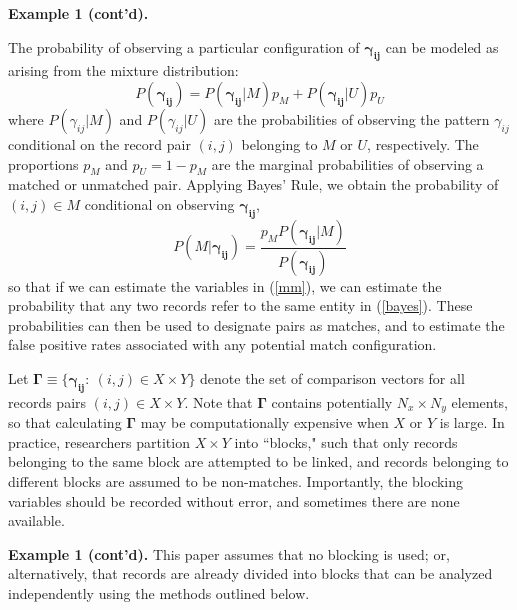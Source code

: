 \documentclass[12pt]{article}
\newcommand\gamij{\mathbf{\gamma_{ij}}}
\begin{document}
\textbf{Example 1 (cont'd).}

The probability of observing a particular configuration of $\gamij$ can be modeled as arising from the mixture distribution:
\begin{equation}
P(\gamij) = P(\gamij | M) p_M + P(\gamij | U) p_U 
\label{mm}
\end{equation}
where $P(\gamma_{ij} | M)$ and $P(\gamma_{ij} | U)$ are the probabilities of observing the pattern $\gamma_{ij}$ conditional on the record pair $(i,j)$ belonging to $M$ or $U$, respectively.  The proportions $p_M$ and $p_U = 1-p_M$ are the marginal probabilities of observing a matched or unmatched pair.  Applying Bayes' Rule, we obtain the probability of $(i,j) \in M$ conditional on observing $\gamij$,
\begin{equation} P(M | \gamij) = \frac{p_M P(\gamij | M)}{P(\gamij)} \label{bayes} \end{equation}
so that if we can estimate the variables in (\ref{mm}), we can estimate the probability that any two records refer to the same entity in (\ref{bayes}).   These probabilities can then be used to designate pairs as matches, and to estimate the false positive rates associated with any potential match configuration.

Let $\mathbf{\Gamma} \equiv \{\mathbf{\gamma_{ij}}: \  (i,j) \in X\times Y\}$ denote the set of comparison vectors for all records pairs $(i,j) \in X\times Y$.   Note that $\mathbf{\Gamma}$ contains potentially $N_x \times N_y$ elements, so that calculating $\mathbf{\Gamma}$ may be computationally expensive when $X$ or $Y$ is large.  In practice, researchers partition $X\times Y$ into ``blocks," such that only records belonging to the same block are attempted to be linked, and records belonging to different blocks are assumed to be non-matches.   Importantly, the blocking variables should be recorded without error, and sometimes there are none available. 


\textbf{Example 1 (cont'd).} This paper assumes that no blocking is used; or, alternatively, that records are already divided into blocks that can be analyzed independently using the methods outlined below.  
\end{document}
